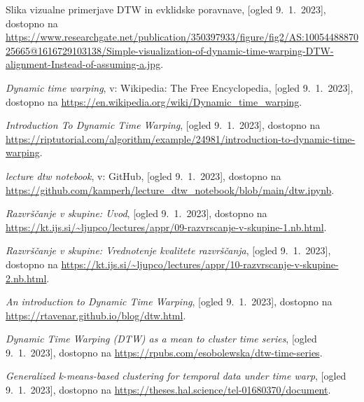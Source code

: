 \documentclass[12pt,a4paper]{article}
\begin{document}
\begin{thebibliography}{99}

    Slika vizualne primerjave DTW in evklidske poravnave, [ogled 9.~1.~2023], dostopno na \url{https://www.researchgate.net/publication/350397933/figure/fig2/AS:1005448887025665@1616729103138/Simple-visualization-of-dynamic-time-warping-DTW-alignment-Instead-of-assuming-a.jpg}.
    
    \emph{Dynamic time warping}, v: Wikipedia: The Free Encyclopedia, [ogled 9.~1.~2023], dostopno na \url{https://en.wikipedia.org/wiki/Dynamic_time_warping}.

    \emph{Introduction To Dynamic Time Warping}, [ogled 9.~1.~2023], dostopno na \url{https://riptutorial.com/algorithm/example/24981/introduction-to-dynamic-time-warping}.

    \emph{lecture dtw notebook}, v: GitHub, [ogled 9.~1.~2023], dostopno na \url{https://github.com/kamperh/lecture_dtw_notebook/blob/main/dtw.ipynb}.

    \emph{Razvrščanje v skupine: Uvod}, [ogled 9.~1.~2023], dostopno na \url{https://kt.ijs.si/~ljupco/lectures/appr/09-razvrscanje-v-skupine-1.nb.html}.

    \emph{Razvrščanje v skupine: Vrednotenje kvalitete razvrščanja}, [ogled 9.~1.~2023], dostopno na \url{https://kt.ijs.si/~ljupco/lectures/appr/10-razvrscanje-v-skupine-2.nb.html}.

    \emph{An introduction to Dynamic Time Warping}, [ogled 9.~1.~2023], dostopno na \url{https://rtavenar.github.io/blog/dtw.html}.

    \emph{Dynamic Time Warping (DTW) as a mean to cluster time series}, [ogled 9.~1.~2023], dostopno na \url{https://rpubs.com/esobolewska/dtw-time-series}.

    \emph{Generalized k-means-based clustering for temporal data under time warp}, [ogled 9.~1.~2023], dostopno na \url{https://theses.hal.science/tel-01680370/document}.

\end{thebibliography}
\end{document}
